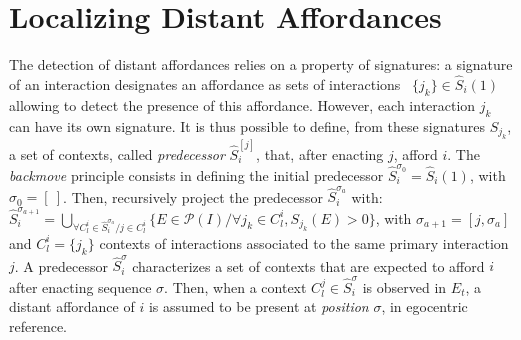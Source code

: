 \documentclass[conference]{IEEEtran}
\begin{document}



\section{Localizing Distant Affordances}\label{localize}


The detection of distant affordances relies on a property of signatures: a signature of an interaction designates an affordance as sets of interactions ~$\{j_k\} \in \hat{S}_i(1)$ allowing to detect the presence of this affordance.
However, each interaction $j_k$ can have its own signature. It is thus possible to define, from these signatures $S_{j_k}$, a set of contexts, called \textit{predecessor} $\hat{S}_i^{[j]}$, that, after enacting $j$, afford $i$. The \textit{backmove} principle consists in defining the initial predecessor $\hat{S}_i^{\sigma_0}=\hat{S}_i(1)$, with $\sigma_0=[~]$. Then, recursively project the predecessor $\hat{S}_i^{\sigma_a}$ with:
$\hat{S}_i^{\sigma_{a+1}}\!=\!\bigcup_{\forall C_l^i \in \hat{S}_i^{\sigma_a} / j \in C_l^i} \{E \in \mathcal{P}(I) / \forall j_k \in C_l^i, S_{j_k}(E)\!>\!0\}$,
with $\sigma_{a+1}=[j,\sigma_a]$ and $C_l^i=\{j_k\}$ contexts of interactions associated to the same primary interaction $j$. %
A predecessor $\hat{S}_i^\sigma$ characterizes a set of contexts that are expected to afford $i$ after enacting sequence $\sigma$. %
Then, when a context $C_l^j \in \hat{S}_i^\sigma$ is observed in $E_t$, a distant affordance of $i$ is assumed to be present at \textit{position} $\sigma$, in egocentric reference.
\end{document}
